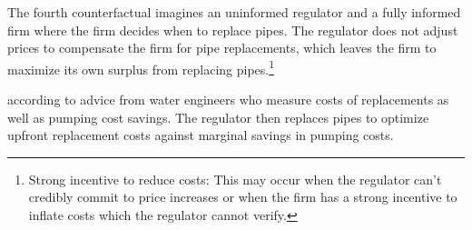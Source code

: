 \documentclass[12pt,table]{article}
\begin{document}








The fourth counterfactual imagines an uninformed regulator and a fully informed firm where the firm decides when to replace pipes.  The regulator does not adjust prices to compensate the firm for pipe replacements, which leaves the firm to maximize its own surplus from replacing pipes.\footnote{Strong incentive to reduce costs: This may occur when the regulator can't credibly commit to price increases or when the firm has a strong incentive to inflate costs which the regulator cannot verify.}




according to advice from water engineers who measure costs of replacements as well as pumping cost savings.  The regulator then replaces pipes to optimize upfront replacement costs against marginal savings in pumping costs.
\end{document}
